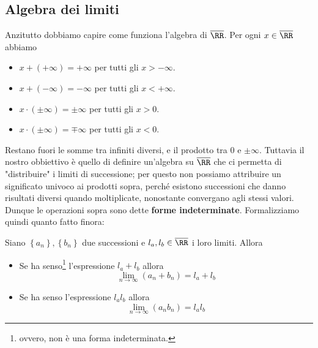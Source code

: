 \documentclass[11pt]{scrartcl}
\begin{document}
	\subsection{Algebra dei limiti}
	Anzitutto dobbiamo capire come funziona l'algebra di $\overline{\RR}$. Per ogni $x\in\overline{\RR}$ abbiamo 
	\begin{itemize}
		\item $x+(+\infty)=+\infty$ per tutti gli $x>-\infty$.
		\item $x+(-\infty)=-\infty$ per tutti gli $x<+\infty$.
		\item $x\cdot (\pm\infty)=\pm\infty$ per tutti gli $x>0$.
		\item $x\cdot (\pm\infty)=\mp\infty$ per tutti gli $x<0$.
	\end{itemize}
	Restano fuori le somme tra infiniti diversi, e il prodotto tra $0$ e $\pm\infty$. Tuttavia il nostro obbiettivo è quello di definire un'algebra su $\overline{\RR}$ che ci permetta di "distribuire" i limiti di successione; per questo non possiamo attribuire un significato univoco ai prodotti sopra, perché esistono successioni che danno risultati diversi quando moltiplicate, nonostante convergano agli stessi valori. Dunque le operazioni sopra sono dette \textbf{forme indeterminate}. Formalizziamo quindi quanto fatto finora:
	\begin{theorem}\label{algebra dei limiti - somme e prodotti non indeterminati}
		Siano $\left\{a_n\right\},\left\{b_n\right\}$ due successioni e $l_a,l_b\in\overline{\RR}$ i loro limiti. Allora
		\begin{itemize}
			\item Se ha senso\footnote{ \label{piedenota} ovvero, non è una forma indeterminata.} l'espressione $l_a+l_b$ allora
			$$\lim_{n\to\infty}(a_n+b_n)=l_a+l_b$$
			\item Se ha senso l'espressione $l_al_b$ allora
			$$\lim_{n\to\infty}(a_nb_n)=l_al_b$$
		\end{itemize}
	\end{theorem}
\end{document}

